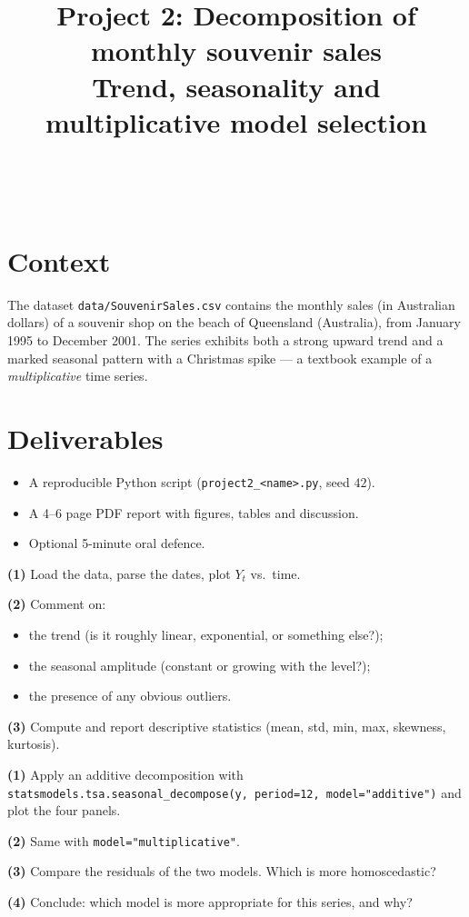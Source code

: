 \documentclass[a4paper,11pt]{article}
\title{Project 2: Decomposition of monthly souvenir sales\\
\large Trend, seasonality and multiplicative model selection}
\author{\auteurNom\\\auteurEmail\\\auteurInstitution}
\date{\anneeUniversitaire}
\begin{document}
\maketitle

\section*{Context}

The dataset \texttt{data/SouvenirSales.csv} contains the monthly
sales (in Australian dollars) of a souvenir shop on the beach of
Queensland (Australia), from January 1995 to December 2001. The series
exhibits both a strong upward trend and a marked seasonal pattern with
a Christmas spike — a textbook example of a \emph{multiplicative}
time series.

\section*{Deliverables}
\begin{itemize}
  \item A reproducible Python script (\texttt{project2\_<name>.py},
        seed $42$).
  \item A 4--6 page PDF report with figures, tables and discussion.
  \item Optional 5-minute oral defence.
\end{itemize}

\begin{exercise}
\textbf{(1)} Load the data, parse the dates, plot $Y_t$ vs.\ time.

\textbf{(2)} Comment on:
\begin{itemize}
  \item the trend (is it roughly linear, exponential, or something else?);
  \item the seasonal amplitude (constant or growing with the level?);
  \item the presence of any obvious outliers.
\end{itemize}

\textbf{(3)} Compute and report descriptive statistics (mean, std, min,
max, skewness, kurtosis).
\end{exercise}

\begin{exercise}
\textbf{(1)} Apply an additive decomposition with
\texttt{statsmodels.tsa.seasonal\_decompose(y, period=12, model="additive")}
and plot the four panels.

\textbf{(2)} Same with \texttt{model="multiplicative"}.

\textbf{(3)} Compare the residuals of the two models. Which is more
homoscedastic?

\textbf{(4)} Conclude: which model is more appropriate for this series,
and why?
\end{exercise}
\end{document}
